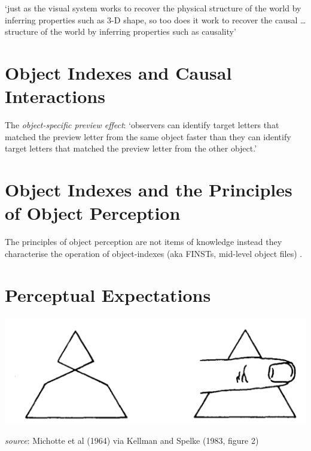 \documentclass[12pt]{extarticle}
\begin{document}
\begin{multicols}{3}
‘just as the visual system works to recover the physical structure of the world by inferring properties such as 3-D shape, so too does it work to recover the causal … structure of the world by inferring properties such as causality’
\citep[p.\ 299]{Scholl:2000eq}
 
 
 
\section{Object Indexes and Causal Interactions}
 
The \emph{object-specific preview effect}: ‘observers can identify target letters that matched the preview letter from the same object faster than they can identify target letters that matched the preview letter from the other object.’
\citep[p.\ 2]{Krushke:1996ge}
 
 
 
\section{Object Indexes and the Principles of Object Perception}
 
The principles of object perception
are not items of knowledge
instead
they characterise the operation of
object-indexes (aka FINSTs, mid-level object files)
\citep{Leslie:1998zk,Scholl:1999mi,Carey:2001ue}.
 
 
 
\section{Perceptual Expectations}
 
\begin{center}
\includegraphics[scale=0.3]{img/kellman_1983_fig2.neg.png}
\end{center} 
\emph{source}: Michotte et al (1964) via Kellman and Spelke (1983, figure 2) 
 
\footnotesize 


\end{multicols}
\end{document}
